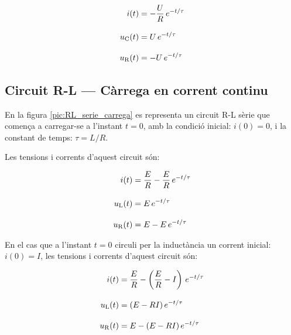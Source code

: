 \hfill
\begin{minipage}[b]{9cm}
    
\end{minipage}
\hfill
\begin{minipage}[b]{6cm}
    \begin{align}
        i(t) &= - \frac{U}{R}\,e^{-t/\tau} \\[3mm]
        u_\mathrm{C}(t) &= U\,e^{-t/\tau} \\[3mm]
        u_\mathrm{R}(t) &= - U\,e^{-t/\tau}
    \end{align}
\end{minipage}


\subsection{Circuit R-L --- Càrrega en corrent continu}\label{sec:RL-carrega}

En la figura \vref{pic:RL_serie_carrega} es representa un circuit R-L sèrie que comença a carregar-se a l'instant $t=0$, amb la condició inicial: $i(0) = 0$, i la constant de temps: $\tau = L/R$.
\begin{center}
    
    \label{pic:RL_serie_carrega}
\end{center}

Les tensions i corrents d'aquest circuit són:

\hfill
\begin{minipage}[b]{9cm}
    
\end{minipage}
\hfill
\begin{minipage}[b]{6cm}
    \begin{align}
        i(t) &= \frac{E}{R}  - \frac{E}{R} \,e^{-t/\tau}\label{eq:RL-i-carrega} \\[3mm]
        u_\mathrm{L}(t) &= E\,e^{-t/\tau}\label{eq:RL-ul-carrega} \\[3mm]
        u_\mathrm{R}(t) &= E - E\,e^{-t/\tau}
    \end{align}
\end{minipage}

\vspace{5mm}
En el cas que a l'instant $t=0$ circuli per la inductància un corrent inicial: $i(0) = I$, les tensions i corrents d'aquest circuit són:

\hfill
\begin{minipage}[b]{9cm}
    
\end{minipage}
\hfill
\begin{minipage}[b]{6cm}
    \begin{align}
        i(t) &= \frac{E}{R}  - \left(\frac{E}{R}-I\right) \,e^{-t/\tau}\label{eq:RL-i-carrega-ini} \\[3mm]
        u_\mathrm{L}(t) &= (E- R I)\,e^{-t/\tau}\label{eq:RL-ul-carrega-ini} \\[3mm]
        u_\mathrm{R}(t) &= E - (E-R I)\,e^{-t/\tau}
    \end{align}
\end{minipage}


